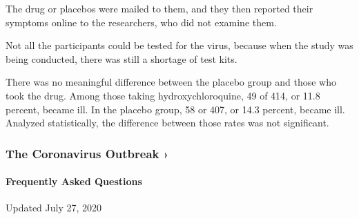 The drug or placebos were mailed to them, and they then reported their
symptoms online to the researchers, who did not examine them.

Not all the participants could be tested for the virus, because when the
study was being conducted, there was still a shortage of test kits.

There was no meaningful difference between the placebo group and those
who took the drug. Among those taking hydroxychloroquine, 49 of 414, or
11.8 percent, became ill. In the placebo group, 58 or 407, or 14.3
percent, became ill. Analyzed statistically, the difference between
those rates was not significant.

\href{https://www.nytimes.com/news-event/coronavirus?action=click\&pgtype=Article\&state=default\&region=MAIN_CONTENT_3\&context=storylines_faq}{}

\hypertarget{the-coronavirus-outbreak-}{%
\subsubsection{The Coronavirus Outbreak
›}\label{the-coronavirus-outbreak-}}

\hypertarget{frequently-asked-questions}{%
\paragraph{Frequently Asked
Questions}\label{frequently-asked-questions}}

Updated July 27, 2020


